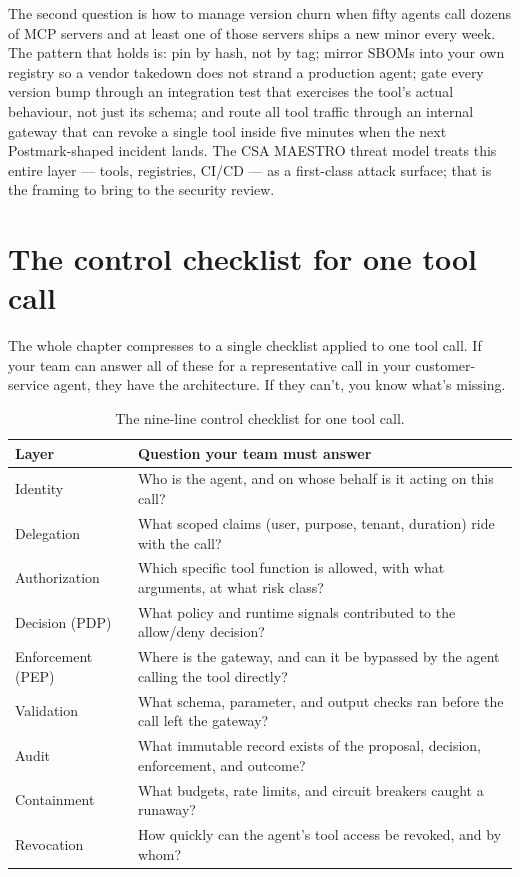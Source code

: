 The second question is how to manage version churn when fifty agents call dozens of MCP servers and at least one of those servers ships a new minor every week. The pattern that holds is: pin by hash, not by tag; mirror SBOMs into your own registry so a vendor takedown does not strand a production agent; gate every version bump through an integration test that exercises the tool's actual behaviour, not just its schema; and route all tool traffic through an internal gateway that can revoke a single tool inside five minutes when the next Postmark-shaped incident lands. The CSA MAESTRO threat model \citep{csa-maestro-2025} treats this entire layer --- tools, registries, CI/CD --- as a first-class attack surface; that is the framing to bring to the security review.

\section{The control checklist for one tool call}

The whole chapter compresses to a single checklist applied to one tool call. If your team can answer all of these for a representative call in your customer-service agent, they have the architecture. If they can't, you know what's missing.

\begin{table}[tb]
\centering
\caption{The nine-line control checklist for one tool call.}
\begin{tabular}{ll}
\toprule
\textbf{Layer} & \textbf{Question your team must answer} \\
\midrule
Identity & Who is the agent, and on whose behalf is it acting on this call? \\
Delegation & What scoped claims (user, purpose, tenant, duration) ride with the call? \\
Authorization & Which specific tool function is allowed, with what arguments, at what risk class? \\
Decision (PDP) & What policy and runtime signals contributed to the allow/deny decision? \\
Enforcement (PEP) & Where is the gateway, and can it be bypassed by the agent calling the tool directly? \\
Validation & What schema, parameter, and output checks ran before the call left the gateway? \\
Audit & What immutable record exists of the proposal, decision, enforcement, and outcome? \\
Containment & What budgets, rate limits, and circuit breakers caught a runaway? \\
Revocation & How quickly can the agent's tool access be revoked, and by whom? \\
\bottomrule
\end{tabular}
\end{table}


